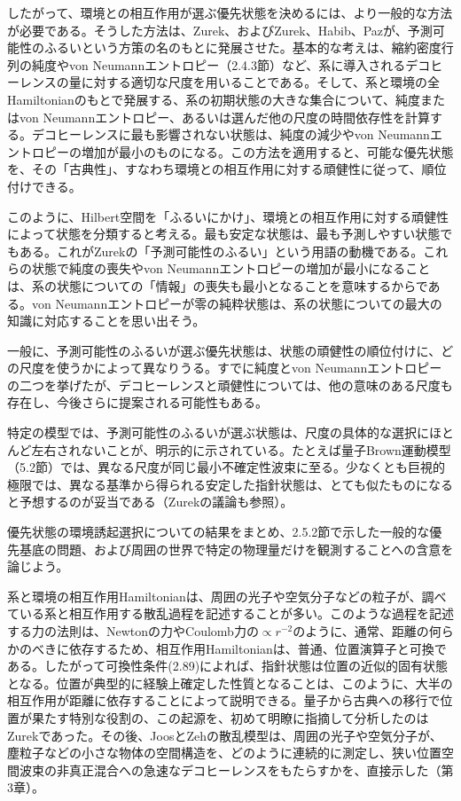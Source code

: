 したがって、環境との相互作用が選ぶ優先状態を決めるには、より一般的な方法が必要である。そうした方法は、Zurek\cite{ref084,ref104}、およびZurek、Habib、Paz\cite{ref086}が、予測可能性のふるいという方策の名のもとに発展させた。基本的な考えは、縮約密度行列の純度やvon Neumannエントロピー（2.4.3節）など、系に導入されるデコヒーレンスの量に対する適切な尺度を用いることである。そして、系と環境の全Hamiltonianのもとで発展する、系の初期状態の大きな集合について、純度またはvon Neumannエントロピー、あるいは選んだ他の尺度の時間依存性を計算する。デコヒーレンスに最も影響されない状態は、純度の減少やvon Neumannエントロピーの増加が最小のものになる。この方法を適用すると、可能な優先状態を、その「古典性」、すなわち環境との相互作用に対する頑健性に従って、順位付けできる。

このように、Hilbert空間を「ふるいにかけ」、環境との相互作用に対する頑健性によって状態を分類すると考える。最も安定な状態は、最も予測しやすい状態でもある。これがZurekの「予測可能性のふるい」という用語の動機である。これらの状態で純度の喪失やvon Neumannエントロピーの増加が最小になることは、系の状態についての「情報」の喪失も最小となることを意味するからである。von Neumannエントロピーが零の純粋状態は、系の状態についての最大の知識に対応することを思い出そう。

一般に、予測可能性のふるいが選ぶ優先状態は、状態の頑健性の順位付けに、どの尺度を使うかによって異なりうる。すでに純度とvon Neumannエントロピーの二つを挙げたが、デコヒーレンスと頑健性については、他の意味のある尺度も存在し、今後さらに提案される可能性もある。

\hypertarget{srcpage:83}{}\label{srcpage:83}
特定の模型では、予測可能性のふるいが選ぶ状態は、尺度の具体的な選択にほとんど左右されないことが、明示的に示されている。たとえば量子Brown運動模型（5.2節）では、異なる尺度が同じ最小不確定性波束に至る\cite{ref006,ref017,ref084,ref105,ref106}。少なくとも巨視的極限では、異なる基準から得られる安定した指針状態は、とても似たものになると予想するのが妥当である（Zurekの議論\cite{ref016}も参照）。

優先状態の環境誘起選択についての結果をまとめ、2.5.2節で示した一般的な優先基底の問題、および周囲の世界で特定の物理量だけを観測することへの含意を論じよう。

系と環境の相互作用Hamiltonianは、周囲の光子や空気分子などの粒子が、調べている系と相互作用する散乱過程を記述することが多い。このような過程を記述する力の法則は、Newtonの力やCoulomb力の$\propto r^{-2}$のように、通常、距離の何らかのべきに依存するため、相互作用Hamiltonianは、普通、位置演算子と可換である。したがって可換性条件(2.89)によれば、指針状態は位置の近似的固有状態となる。位置が典型的に経験上確定した性質となることは、このように、大半の相互作用が距離に依存することによって説明できる。量子から古典への移行で位置が果たす特別な役割の、この起源を、初めて明瞭に指摘して分析したのはZurek\cite{ref008,ref009,ref013}であった。その後、JoosとZehの散乱模型\cite{ref007}は、周囲の光子や空気分子が、塵粒子などの小さな物体の空間構造を、どのように連続的に測定し、狭い位置空間波束の非真正混合への急速なデコヒーレンスをもたらすかを、直接示した（第3章）。

